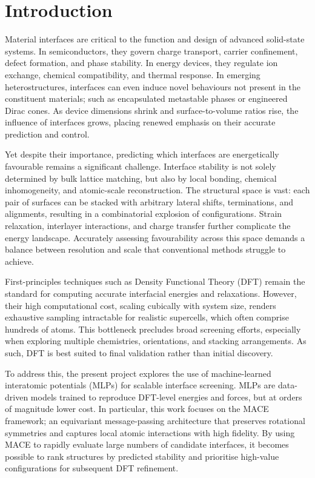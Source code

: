 \chapter{Introduction} \label{chapter:introduction}

Material interfaces are critical to the function and design of advanced solid-state systems. In semiconductors, they govern charge transport, carrier confinement, defect formation, and phase stability. In energy devices, they regulate ion exchange, chemical compatibility, and thermal response. In emerging heterostructures, interfaces can even induce novel behaviours not present in the constituent materials; such as encapsulated metastable phases or engineered Dirac cones. As device dimensions shrink and surface-to-volume ratios rise, the influence of interfaces grows, placing renewed emphasis on their accurate prediction and control. 

Yet despite their importance, predicting which interfaces are energetically favourable remains a significant challenge. Interface stability is not solely determined by bulk lattice matching, but also by local bonding, chemical inhomogeneity, and atomic-scale reconstruction. The structural space is vast: each pair of surfaces can be stacked with arbitrary lateral shifts, terminations, and alignments, resulting in a combinatorial explosion of configurations. Strain relaxation, interlayer interactions, and charge transfer further complicate the energy landscape. Accurately assessing favourability across this space demands a balance between resolution and scale that conventional methods struggle to achieve. 

First-principles techniques such as Density Functional Theory (DFT) remain the standard for computing accurate interfacial energies and relaxations. However, their high computational cost, scaling cubically with system size, renders exhaustive sampling intractable for realistic supercells, which often comprise hundreds of atoms. This bottleneck precludes broad screening efforts, especially when exploring multiple chemistries, orientations, and stacking arrangements. As such, DFT is best suited to final validation rather than initial discovery. 

To address this, the present project explores the use of machine-learned interatomic potentials (MLPs) for scalable interface screening. MLPs are data-driven models trained to reproduce DFT-level energies and forces, but at orders of magnitude lower cost. In particular, this work focuses on the MACE framework; an equivariant message-passing architecture that preserves rotational symmetries and captures local atomic interactions with high fidelity. By using MACE to rapidly evaluate large numbers of candidate interfaces, it becomes possible to rank structures by predicted stability and prioritise high-value configurations for subsequent DFT refinement. 


